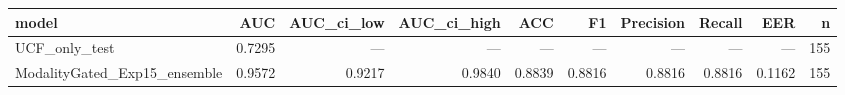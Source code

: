 \begin{tabular}{lrrrrrrrrr}
\toprule
model & AUC & AUC_ci_low & AUC_ci_high & ACC & F1 & Precision & Recall & EER & n \\
\midrule
UCF_only_test & 0.7295 & — & — & — & — & — & — & — & 155 \\
ModalityGated_Exp15_ensemble & 0.9572 & 0.9217 & 0.9840 & 0.8839 & 0.8816 & 0.8816 & 0.8816 & 0.1162 & 155 \\
\bottomrule
\end{tabular}
